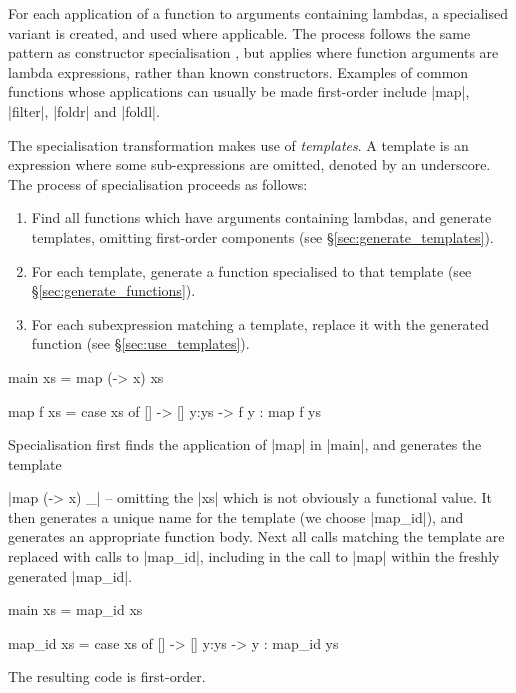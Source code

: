 \documentclass[preprint]{sigplanconf}
\begin{document}
For each application of a function to arguments containing lambdas, a specialised variant is created, and used where applicable. The process follows the same pattern as constructor specialisation \cite{spj:specconstr}, but applies where function arguments are lambda expressions, rather than known constructors. Examples of common functions whose applications can usually be made first-order include |map|, |filter|, |foldr| and |foldl|.

The specialisation transformation makes use of \textit{templates}. A template is an expression where some sub-expressions are omitted, denoted by an underscore. The process of specialisation proceeds as follows:

\begin{enumerate}
\item Find all functions which have arguments containing lambdas, and generate templates, omitting first-order components (see \S\ref{sec:generate_templates}).
\item For each template, generate a function specialised to that template (see \S\ref{sec:generate_functions}).
\item For each subexpression matching a template, replace it with the generated function (see \S\ref{sec:use_templates}).
\end{enumerate}

\begin{example}
\label{ex:map_id}
\begin{code}
main xs = map (\x -> x) xs

map f xs = case  xs of
                 []    -> []
                 y:ys  -> f y : map f ys
\end{code}

Specialisation first finds the application of |map| in |main|, and generates the template \ignore|map (\x -> x) _| -- omitting the |xs| which is not obviously a functional value. It then generates a unique name for the template (we choose |map_id|), and generates an appropriate function body. Next all calls matching the template are replaced with calls to |map_id|, including in the call to |map| within the freshly generated |map_id|.

\begin{code}
main xs = map_id xs

map_id xs = case  xs of
                  []    -> []
                  y:ys  -> y : map_id ys
\end{code}

The resulting code is first-order.
\end{example}
\end{document}
